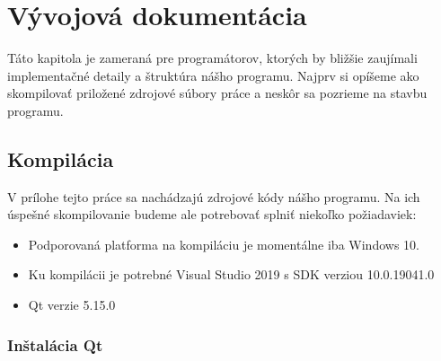 \chapter{Vývojová dokumentácia}
\label{chap:vyvoj_dok}

Táto kapitola je zameraná pre programátorov, ktorých by bližšie zaujímali implementačné detaily a štruktúra nášho programu. Najprv si opíšeme ako skompilovať priložené zdrojové súbory práce a neskôr sa pozrieme na stavbu programu.

\section{Kompilácia}
V prílohe tejto práce sa nachádzajú zdrojové kódy nášho programu. Na ich úspešné skompilovanie budeme ale potrebovať splniť niekoľko požiadaviek:
\begin{itemize}
\item Podporovaná platforma na kompiláciu je momentálne iba Windows 10.
\item Ku kompilácii je potrebné Visual Studio 2019 s SDK verziou 10.0.19041.0
\item Qt verzie 5.15.0
\end{itemize}

\subsection{Inštalácia Qt}

